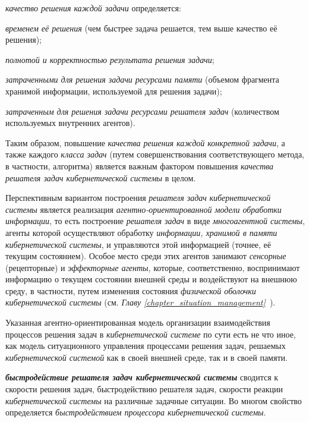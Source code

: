 \textit{качество решения каждой задачи} определяется:
\begin{textitemize}
    \item \textit{временем её решения} (чем быстрее задача решается, тем выше качество её решения);
    \item \textit{полнотой и корректностью результата решения задачи};
    \item \textit{затраченными для решения задачи ресурсами памяти} (объемом фрагмента хранимой информации, используемой для решения задачи);
    \item \textit{затраченным для решения задачи ресурсами решателя задач} (количеством используемых внутренних агентов).
\end{textitemize}

Таким образом, повышение \textit{качества решения каждой конкретной задачи}, а также каждого \textit{класса задач} (путем совершенствования соответствующего метода, в частности, алгоритма) является важным фактором повышения \textit{качества решателя задач кибернетической системы} в целом.

Перспективным вариантом построения \textit{решателя задач} \textit{кибернетической системы} является реализация \textit{агентно-ориентированной модели обработки информации}, то есть построение \textit{решателя задач} в виде \textit{многоагентной системы}, агенты которой осуществляют обработку \textit{информации, хранимой в памяти кибернетической системы}, и управляются этой информацией (точнее, её текущим состоянием). 
Особое место среди этих агентов занимают \textit{сенсорные} (рецепторные) и \textit{эффекторные агенты}, которые, соответственно, воспринимают информацию о текущем состоянии внешней среды и воздействуют на внешнюю среду, в частности, путем изменения состояния \textit{физической оболочки кибернетической системы} (см. \textit{Главу \ref{chapter_situation_management}~}).

Указанная агентно-ориентированная модель организации взаимодействия процессов решения задач в \textit{кибернетической системе} по сути есть не что иное, как модель ситуационного управления процессами решения задач, решаемых \textit{кибернетической системой} как в своей внешней среде, так и в своей памяти.

\textbf{\textit{быстродействие решателя задач кибернетической системы}} сводится к скорости решения задач, быстродействию решателя задач, скорости реакции \textit{кибернетической системы} на различные задачные ситуации. Во многом свойство определяется \textit{быстродействием процессора кибернетической системы}.

